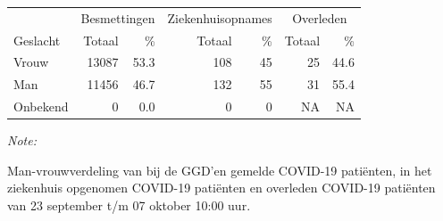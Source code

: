 \documentclass[
  english,
  man,floatsintext]{apa6}
\begin{document}
\begin{table}
\centering\begingroup\fontsize{11}{13}\selectfont

\begin{threeparttable}
\begin{tabular}{lrrrrrr}
\toprule
\multicolumn{1}{c}{ } & \multicolumn{2}{c}{Besmettingen} & \multicolumn{2}{c}{Ziekenhuisopnames} & \multicolumn{2}{c}{Overleden} \\
\cmidrule(l{3pt}r{3pt}){2-3} \cmidrule(l{3pt}r{3pt}){4-5} \cmidrule(l{3pt}r{3pt}){6-7}
Geslacht & Totaal & \% & Totaal & \% & Totaal & \%\\
\midrule
Vrouw & 13087 & 53.3 & 108 & 45 & 25 & 44.6\\
Man & 11456 & 46.7 & 132 & 55 & 31 & 55.4\\
Onbekend & 0 & 0.0 & 0 & 0 & NA & NA\\
\bottomrule
\end{tabular}
\begin{tablenotes}
\item \textit{Note: } 
\item Man-vrouwverdeling van bij de GGD’en gemelde COVID-19 patiënten, in het ziekenhuis opgenomen COVID-19 patiënten en overleden COVID-19 patiënten van 23 september t/m 07 oktober 10:00 uur.
\end{tablenotes}
\end{threeparttable}
\endgroup{}
\end{table}
\newpage
\end{document}
